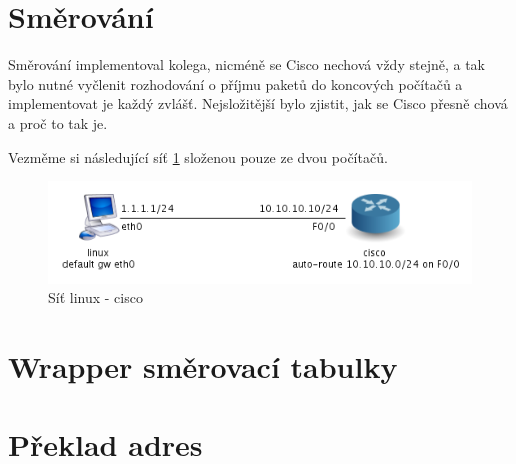 \section{Směrování}\label{prijmiEthernetove}
Směrování implementoval kolega, nicméně se Cisco nechová vždy stejně, a tak bylo nutné vyčlenit rozhodování o příjmu paketů do koncových počítačů a implementovat je každý zvlášť. Nejsložitější bylo zjistit, jak se Cisco přesně chová a proč to tak je.

Vezměme si následující síť \ref{fig:sit_2pc} složenou pouze ze dvou počítačů.

\begin{figure}[h]
\begin{center}
\includegraphics[width=12cm]{figures/sit_2pc.png}
\caption{Síť linux - cisco}
\label{fig:sit_2pc}
\end{center}
\end{figure}




\section{Wrapper směrovací tabulky}

\section{Překlad adres}

